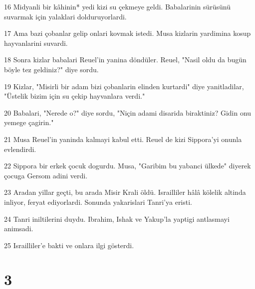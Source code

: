 \par 16 Midyanli bir kâhinin* yedi kizi su çekmeye geldi. Babalarinin sürüsünü suvarmak için yalaklari dolduruyorlardi.
\par 17 Ama bazi çobanlar gelip onlari kovmak istedi. Musa kizlarin yardimina kosup hayvanlarini suvardi.
\par 18 Sonra kizlar babalari Reuel'in yanina döndüler. Reuel, "Nasil oldu da bugün böyle tez geldiniz?" diye sordu.
\par 19 Kizlar, "Misirli bir adam bizi çobanlarin elinden kurtardi" diye yanitladilar, "Üstelik bizim için su çekip hayvanlara verdi."
\par 20 Babalari, "Nerede o?" diye sordu, "Niçin adami disarida biraktiniz? Gidin onu yemege çagirin."
\par 21 Musa Reuel'in yaninda kalmayi kabul etti. Reuel de kizi Sippora'yi onunla evlendirdi.
\par 22 Sippora bir erkek çocuk dogurdu. Musa, "Garibim bu yabanci ülkede" diyerek çocuga Gersom adini verdi.
\par 23 Aradan yillar geçti, bu arada Misir Krali öldü. Israilliler hâlâ kölelik altinda inliyor, feryat ediyorlardi. Sonunda yakarislari Tanri'ya eristi.
\par 24 Tanri iniltilerini duydu. Ibrahim, Ishak ve Yakup'la yaptigi antlasmayi animsadi.
\par 25 Israilliler'e bakti ve onlara ilgi gösterdi.

\chapter{3}

